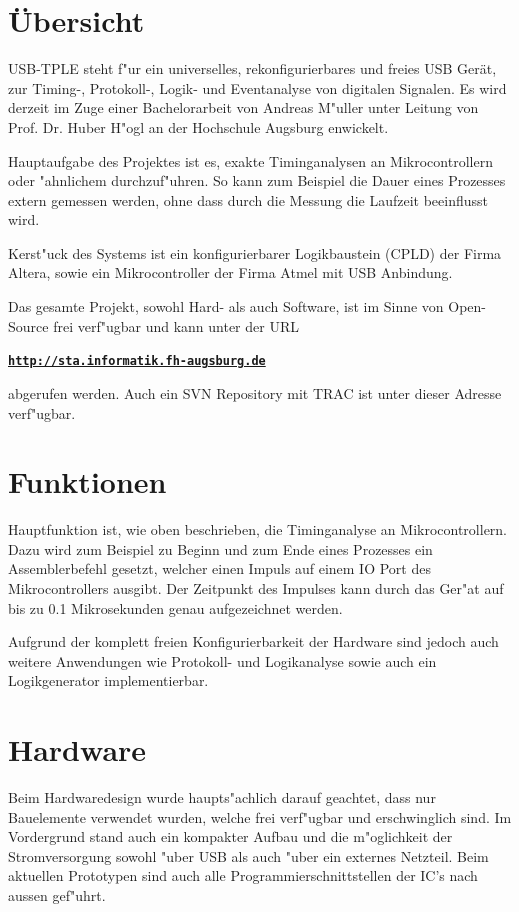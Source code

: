 \documentclass[
a4paper,
]{leaflet}
\begin{document}
\eject

\section{\"Ubersicht}

USB-TPLE steht f"ur ein universelles, rekonfigurierbares und freies USB Ger\"at, zur Timing-, Protokoll-, Logik- und Eventanalyse von digitalen Signalen. Es wird derzeit im Zuge einer Bachelorarbeit von Andreas M"uller unter Leitung von Prof. Dr. Huber H"ogl an der Hochschule Augsburg enwickelt.

Hauptaufgabe des Projektes ist es, exakte Timing\-analysen an Mikrocontrollern oder "ahnlichem durchzuf"uhren. So kann zum Beispiel die Dauer eines Prozesses extern gemessen werden, ohne dass durch die Messung die Laufzeit beeinflusst wird.

Kerst"uck des Systems ist ein konfigurierbarer Logikbaustein (CPLD) der Firma Altera, sowie ein Mikrocontroller der Firma Atmel mit USB Anbindung. 

Das gesamte Projekt, sowohl Hard- als auch Software, ist im Sinne von Open-Source frei verf"ugbar und kann unter der URL

{\bf \underline \tt \large http://sta.informatik.fh-augsburg.de}

abgerufen werden. Auch ein SVN Repository mit TRAC ist unter dieser Adresse verf"ugbar.

\section{Funktionen}

Hauptfunktion ist, wie oben beschrieben, die Timinganalyse an Mikrocontrollern. Dazu wird zum Beispiel zu Beginn und zum Ende eines Prozesses ein Assemblerbefehl gesetzt, welcher einen Impuls auf einem IO Port des Mikrocontrollers ausgibt. Der Zeitpunkt des Impulses kann durch das Ger"at auf bis zu 0.1 Mikrosekunden genau aufgezeichnet werden.

Aufgrund der komplett freien Konfigurierbarkeit der Hardware sind jedoch auch weitere Anwendungen wie Protokoll- und Logikanalyse sowie auch ein Logikgenerator implementierbar.

\section{Hardware}

Beim Hardwaredesign wurde haupts"achlich darauf geachtet, dass nur Bauelemente verwendet wurden, welche frei verf"ugbar und erschwinglich sind. Im Vordergrund stand auch ein kompakter Aufbau und die m"oglichkeit der Stromversorgung sowohl "uber USB als auch "uber ein externes Netzteil. Beim aktuellen Prototypen sind auch alle Programmierschnittstellen der IC's nach aussen gef"uhrt. 
\end{document}
